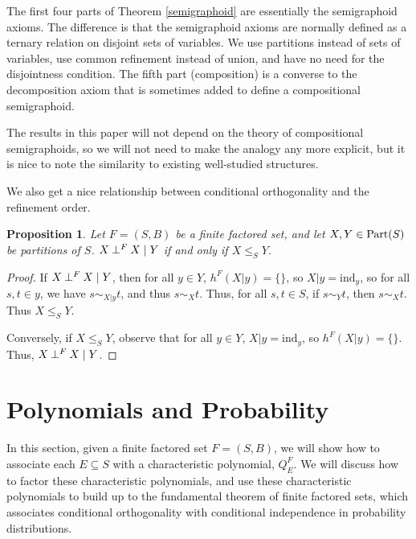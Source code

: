 \documentclass[authordate,onecolumn]{miri-tech-article}
\newtheorem{proposition}{Proposition}
\begin{document}
The first four parts of Theorem \ref{semigraphoid} are essentially the semigraphoid axioms. The difference is that the semigraphoid axioms are normally defined as a ternary relation on disjoint sets of variables. We use partitions instead of sets of variables, use common refinement instead of union, and have no need for the disjointness condition. The fifth part (composition) is a converse to the decomposition axiom that is sometimes added to define a compositional semigraphoid.


The results in this paper will not depend on the theory of compositional semigraphoids, so we will not need to make the analogy any more explicit, but it is nice to note the similarity to existing well-studied structures.

We also get a nice relationship between conditional orthogonality and the refinement order.

\begin{proposition}
Let $F=(S,B)$ be a finite factored set, and let $X,Y\in \text{Part}(S)$ be partitions of $S$. $X\mathbin{\perp^{F}}X\mid Y$ if and only if $X\leq_S Y$.
\end{proposition}
\begin{proof}
If $X\mathbin{\perp^{F}}X\mid Y$, then for all $y\in Y$, $h^F(X|y)=\{\}$, so $X|y=\text{ind}_y$, so for all $s,t\in y$, we have $s\sim_{X|y} t$, and thus $s\sim_{X} t$. Thus, for all $s,t\in S$, if $s\sim_Y t$, then $s\sim_X t$. Thus $X\leq_S Y$.

Conversely, if $X\leq_S Y$, observe that for all $y\in Y$, $X|y=\text{ind}_y$, so $h^F(X|y)=\{\}$. Thus, $X\mathbin{\perp^{F}}X\mid Y$.
\end{proof}
\section{Polynomials and Probability}
In this section, given a finite factored set $F=(S,B)$, we will show how to associate each $E\subseteq S$ with a characteristic polynomial, $Q^F_E$. We will discuss how to factor these characteristic polynomials, and use these characteristic polynomials to build up to the fundamental theorem of finite factored sets, which associates conditional orthogonality with conditional independence in probability distributions.
\end{document}
